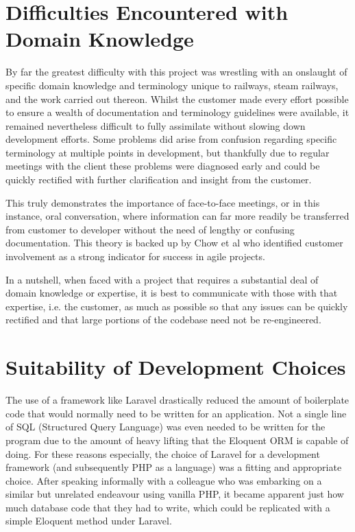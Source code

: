 \section{Difficulties Encountered with Domain Knowledge}
By far the greatest difficulty with this project was wrestling with an onslaught of specific domain knowledge and terminology unique to railways, steam railways, and the work carried out thereon. Whilst the customer made every effort possible to ensure a wealth of documentation and terminology guidelines were available, it remained nevertheless difficult to fully assimilate without slowing down development efforts. Some problems did arise from confusion regarding specific terminology at multiple points in development, but thankfully due to regular meetings with the client these problems were diagnosed early and could be quickly rectified with further clarification and insight from the customer. 

This truly demonstrates the importance of face-to-face meetings, or in this instance, oral conversation, where information can far more readily be transferred from customer to developer without the need of lengthy or confusing documentation. This theory is backed up by Chow et al who identified customer involvement as a strong indicator for success in agile projects. \cite{CHOW2008961}

In a nutshell, when faced with a project that requires a substantial deal of domain knowledge or expertise, it is best to communicate with those with that expertise, i.e. the customer, as much as possible so that any issues can be quickly rectified and that large portions of the codebase need not be re-engineered.

\section{Suitability of Development Choices}
The use of a framework like Laravel drastically reduced the amount of boilerplate code that would normally need to be written for an application. Not a single line of SQL (Structured Query Language) was even needed to be written for the program due to the amount of heavy lifting that the Eloquent ORM is capable of doing. For these reasons especially, the choice of Laravel for a development framework (and subsequently PHP as a language) was a fitting and appropriate choice. After speaking informally with a colleague who was embarking on a similar but unrelated endeavour using vanilla PHP, it became apparent just how much database code that they had to write, which could be replicated with a simple Eloquent method under Laravel.

